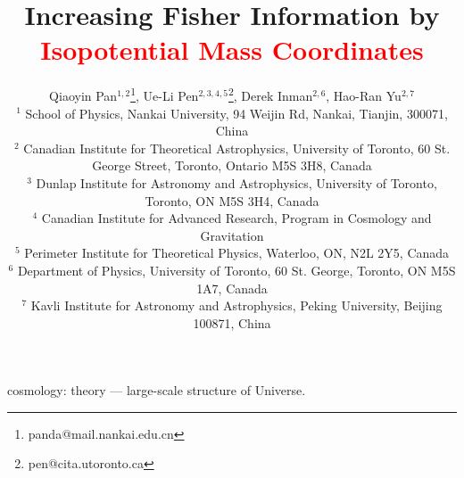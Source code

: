 \documentclass[fleqn,useAMS,usenatbib]{mnras}
\newcommand{\tcr}{\textcolor{red}}
\begin{document}
\title[Information increase by \tcr{Isopotential Mass Coordinates}]
{Increasing Fisher Information by \tcr{Isopotential Mass Coordinates}}
\author[Pan et al.]
{Qiaoyin Pan$^{1,2}$\thanks{panda@mail.nankai.edu.cn},
Ue-Li Pen$^{2,3,4,5}$\thanks{pen@cita.utoronto.ca},
Derek Inman$^{2,6}$,
Hao-Ran Yu$^{2,7}$\\
$^{1}$ School of Physics, Nankai University, 94 Weijin Rd, Nankai, Tianjin, 300071, China\\
$^{2}$ Canadian Institute for Theoretical Astrophysics, University of Toronto, 60 St. George Street, Toronto, Ontario M5S 3H8, Canada\\
$^{3}$ Dunlap Institute for Astronomy and Astrophysics, University of Toronto, Toronto, ON M5S 3H4, Canada\\
$^{4}$ Canadian Institute for Advanced Research, Program in Cosmology and Gravitation\\
$^{5}$ Perimeter Institute for Theoretical Physics, Waterloo, ON, N2L 2Y5, Canada\\
$^{6}$ Department of Physics, University of Toronto, 60 St. George, Toronto, ON M5S 1A7, Canada\\
$^{7}$ Kavli Institute for Astronomy and Astrophysics, Peking University, Beijing 100871, China}

\pagerange{\pageref{firstpage}--\pageref{lastpage}} 
\maketitle
\label{firstpage}



\begin{keywords}
  cosmology: theory --- large-scale structure of Universe.
\end{keywords}
















\bsp	%
\label{lastpage}
\end{document}
